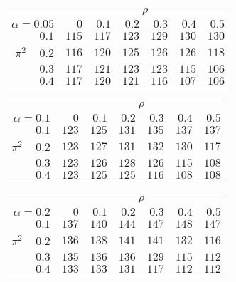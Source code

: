 \begin{tabular}{r|rrrrrr}
\hline\hline
 &\multicolumn{6}{c}{$\rho$} \\ 
 $\alpha = 0.05$ & $0$ & $0.1$ & $0.2$ & $0.3$ & $0.4$ & $0.5$ \\ 
 \hline$0.1$ & $115$ & $117$ & $123$ & $129$ & $130$ & $130$\\ 
$\pi^2\;\;\;$ $0.2$ & $116$ & $120$ & $125$ & $126$ & $126$ & $118$\\ 
$0.3$ & $117$ & $121$ & $123$ & $123$ & $115$ & $106$\\ 
$0.4$ & $117$ & $120$ & $121$ & $116$ & $107$ & $106$\\ 
 \hline 
 \end{tabular}
 
 \vspace{2em} 
 
\begin{tabular}{r|rrrrrr}
\hline\hline
 &\multicolumn{6}{c}{$\rho$} \\ 
 $\alpha = 0.1$ & $0$ & $0.1$ & $0.2$ & $0.3$ & $0.4$ & $0.5$ \\ 
 \hline$0.1$ & $123$ & $125$ & $131$ & $135$ & $137$ & $137$\\ 
$\pi^2\;\;\;$ $0.2$ & $123$ & $127$ & $131$ & $132$ & $130$ & $117$\\ 
$0.3$ & $123$ & $126$ & $128$ & $126$ & $115$ & $108$\\ 
$0.4$ & $123$ & $125$ & $125$ & $116$ & $108$ & $108$\\ 
 \hline 
 \end{tabular}
 
 \vspace{2em} 
 
\begin{tabular}{r|rrrrrr}
\hline\hline
 &\multicolumn{6}{c}{$\rho$} \\ 
 $\alpha = 0.2$ & $0$ & $0.1$ & $0.2$ & $0.3$ & $0.4$ & $0.5$ \\ 
 \hline$0.1$ & $137$ & $140$ & $144$ & $147$ & $148$ & $147$\\ 
$\pi^2\;\;\;$ $0.2$ & $136$ & $138$ & $141$ & $141$ & $132$ & $116$\\ 
$0.3$ & $135$ & $136$ & $136$ & $129$ & $115$ & $112$\\ 
$0.4$ & $133$ & $133$ & $131$ & $117$ & $112$ & $112$\\ 
 \hline 
 \end{tabular}